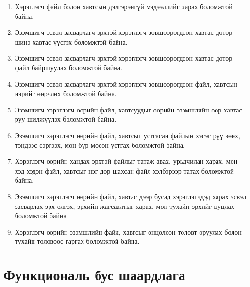 \begin{enumerate}
\item Хэрэглэгч файл болон хавтсын дэлгэрэнгүй мэдээллийг харах боломжтой байна.

\item Эзэмшигч эсвэл засварлагч эрхтэй хэрэглэгч зөвшөөрөгдсөн хавтас дотор шинэ хавтас үүсгэх боломжтой байна.

\item Эзэмшигч эсвэл засварлагч эрхтэй хэрэглэгч зөвшөөрөгдсөн хавтас дотор файл байршуулах боломжтой байна.

\item Эзэмшигч эсвэл засварлагч эрхтэй хэрэглэгч зөвшөөрөгдсөн файл, хавтсын нэрийг өөрчлөх боломжтой байна.

\item Эзэмшигч хэрэглэгч өөрийн файл, хавтсуудыг өөрийн эзэмшлийн өөр хавтас руу шилжүүлэх боломжтой байна.

\item Эзэмшигч хэрэглэгч өөрийн файл, хавтсыг устгасан файлын хэсэг рүү зөөх, тэндээс сэргээх, мөн бүр мөсөн устгах боломжтой байна.

\item Хэрэглэгч өөрийн хандах эрхтэй файлыг татаж авах, урьдчилан харах, мөн хэд хэдэн файл, хавтсыг нэг дор шахсан файл хэлбэрээр татах боломжтой байна.

\item Эзэмшигч хэрэглэгч өөрийн файл, хавтас дээр бусад хэрэглэгчдэд харах эсвэл засварлах эрх олгох, эрхийн жагсаалтыг харах, мөн тухайн эрхийг цуцлах боломжтой байна.

\item Хэрэглэгч өөрийн эзэмшлийн файл, хавтсыг онцолсон төлөвт оруулах болон тухайн төлөвөөс гаргах боломжтой байна.

\end{enumerate}


\section{Функциональ бус шаардлага}

